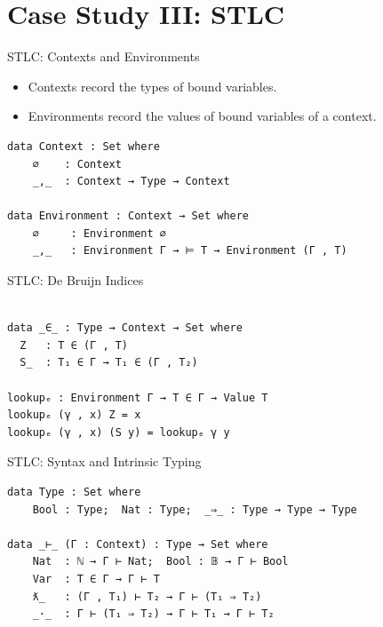 \documentclass[10pt,compress,aspectratio=169]{beamer}
\begin{document}
\section{Case Study III: STLC}

\begin{frame}[fragile]{STLC: Contexts and Environments}
\begin{itemize}
    \item Contexts record the types of bound variables.
    \item Environments record the values of bound variables of a context.
\end{itemize}
\begin{verbatim}
data Context : Set where
    ∅    : Context
    _,_  : Context → Type → Context

data Environment : Context → Set where
    ∅     : Environment ∅
    _,_   : Environment Γ → ⊨ T → Environment (Γ , T)
\end{verbatim}
\end{frame}

\begin{frame}[fragile]{STLC: De Bruijn Indices}
\begin{verbatim}

data _∈_ : Type → Context → Set where
  Z   : T ∈ (Γ , T)
  S_  : T₁ ∈ Γ → T₁ ∈ (Γ , T₂)

lookupₑ : Environment Γ → T ∈ Γ → Value T
lookupₑ (γ , x) Z = x
lookupₑ (γ , x) (S y) = lookupₑ γ y
\end{verbatim}
\end{frame}


\begin{frame}[fragile]{STLC: Syntax and Intrinsic Typing}
\begin{verbatim}
data Type : Set where
    Bool : Type;  Nat : Type;  _⇒_ : Type → Type → Type

data _⊢_ (Γ : Context) : Type → Set where
    Nat  : ℕ → Γ ⊢ Nat;  Bool : 𝔹 → Γ ⊢ Bool
    Var  : T ∈ Γ → Γ ⊢ T
    ƛ_   : (Γ , T₁) ⊢ T₂ → Γ ⊢ (T₁ ⇒ T₂)
    _·_  : Γ ⊢ (T₁ ⇒ T₂) → Γ ⊢ T₁ → Γ ⊢ T₂
\end{verbatim}
\end{frame}
\end{document}
